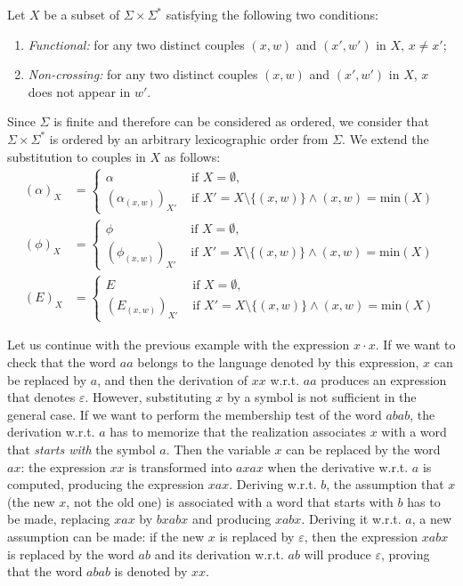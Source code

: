 \documentclass[a4paper]{llncs}
\begin{document}
 Let $X$ be a subset of $\Sigma\times\Sigma^*$ satisfying the following two conditions:
 \begin{enumerate}
   \item \emph{Functional:} for any two distinct couples $(x,w)$ and $(x',w')$ in $X$, $x\neq x'$;
   \item \emph{Non-crossing: }for any two distinct couples $(x,w)$ and $(x',w')$ in $X$, $x$ does not appear in $w'$.
 \end{enumerate}
 Since $\Sigma$ is finite and therefore can be considered as ordered, we consider that $\Sigma\times\Sigma^*$ is ordered by an arbitrary lexicographic order from $\Sigma$.
 We extend the substitution to couples in $X$ as follows:
  \begin{align*}
    (\alpha)_{X}&=
      \begin{cases}
          \alpha & \text{ if } X=\emptyset,\\
          (\alpha_{(x,w)})_{X'} & \text{ if } X'=X\setminus\{(x,w)\} \wedge (x,w)=\mathrm{min}(X)
      \end{cases}\\     
    (\phi)_{X}&=
      \begin{cases}
          \phi & \text{ if } X=\emptyset,\\
          (\phi_{(x,w)})_{X'} & \text{ if } X'=X\setminus\{(x,w)\} \wedge (x,w)=\mathrm{min}(X)
      \end{cases}\\
    (E)_{X}&=
      \begin{cases}
          E & \text{ if } X=\emptyset,\\
          (E_{(x,w)})_{X'} & \text{ if } X'=X\setminus\{(x,w)\} \wedge (x,w)=\mathrm{min}(X)
      \end{cases}
  \end{align*}
  


  Let us continue with the previous example with the expression $x\cdot x$. If we want to check that the word $aa$ belongs to the language denoted by this expression, $x$ can be replaced by $a$, and then the derivation of $xx$ w.r.t. $aa$ produces an expression that denotes $\varepsilon$. However, substituting $x$ by a symbol is not sufficient in the general case. If we want to perform the membership test of the word $abab$, the derivation w.r.t. $a$ has to memorize that the realization associates $x$ with a word that \emph{starts with} the symbol $a$. Then the variable $x$ can be replaced by the word $ax$: the expression $xx$ is transformed into $axax$ when the derivative w.r.t. $a$ is computed, producing the expression $xax$. Deriving w.r.t. $b$, the assumption that $x$ (the new $x$, not the old one) is associated with a word that starts with $b$ has to be made, replacing $xax$ by $bxabx$ and producing $xabx$. Deriving it w.r.t. $a$, a new assumption can be made: if the new $x$ is replaced by $\varepsilon$, then the expression $xabx$ is replaced by the word $ab$ and its derivation w.r.t. $ab$ will produce $\varepsilon$, proving  that the word $abab$ is denoted by $xx$.
  
\end{document}
